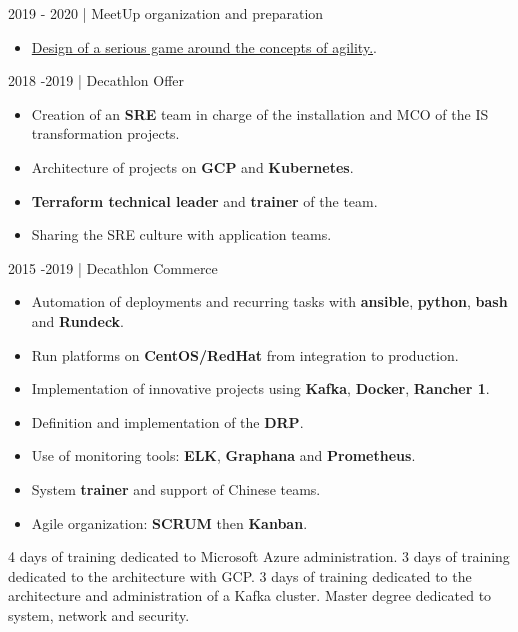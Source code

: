 \documentclass[
	a4paper,
	maincolor=cvartifakt,
	sidecolor=cvgray,
	sidebartextcolor=cvwhite,
	sectioncolor=cvartifakt,
	subsectioncolor=cvgray,
	sidebarwidth=0.36\paperwidth,
    topbottommargin=0.04\paperheight,
]{fortysecondscv}
\begin{document}
\begin{cvtable}[2]
{        \vspace{8pt}
	    \textcolor{maincolor}{2019 - 2020 | MeetUp organization and preparation}
	    \begin{itemize}
	        \item \href{https://www.meetup.com/fr-FR/AGILE-BY-CONSERTO/events/267376871/}{Design of a serious game around the concepts of agility.}.
	    \end{itemize}
		}
	    {
	    \textcolor{maincolor}{2018 -2019 | Decathlon Offer}
	    \begin{itemize}
            \item Creation of an \textbf{SRE} team in charge of the installation and MCO of the IS transformation projects.
            \item Architecture of projects on \textbf{GCP} and \textbf{Kubernetes}.
            \item \textbf{Terraform technical leader} and \textbf{trainer} of the team.
            \item Sharing the SRE culture with application teams.
        \end{itemize}
        \vspace{8pt}
        \textcolor{maincolor}{2015 -2019 | Decathlon Commerce}
	    \begin{itemize}
            \item Automation of deployments and recurring tasks with \textbf{ansible}, \textbf{python}, \textbf{bash} and \textbf{Rundeck}.
            \item Run platforms on \textbf{CentOS/RedHat} from integration to production.
            \item Implementation of innovative projects using \textbf{Kafka}, \textbf{Docker}, \textbf{Rancher 1}.
            \item Definition and implementation of the \textbf{DRP}.
            \item Use of monitoring tools: \textbf{ELK}, \textbf{Graphana} and \textbf{Prometheus}.
            \item System \textbf{trainer} and support of Chinese teams.
            \item Agile organization: \textbf{SCRUM} then \textbf{Kanban}.
        \end{itemize}
		}
\end{cvtable}

\begin{cvtable}[2]
		{4 days of training dedicated to Microsoft Azure administration.}
		{3 days of training dedicated to the architecture with GCP.}
		{3 days of training dedicated to the architecture and administration of a Kafka cluster.}
		{Master degree dedicated to system, network and security.}
\end{cvtable}

\vspace{-11pt}
\end{document}
